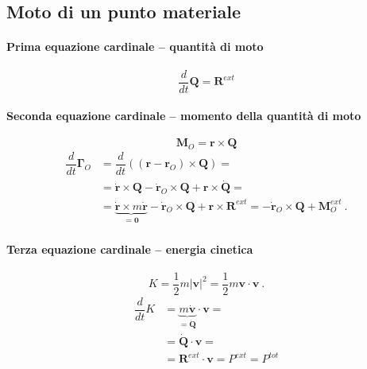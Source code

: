 \subsection{Moto di un punto materiale}
\paragraph{Prima equazione cardinale -- quantità di moto}
\begin{equation}
    \dfrac{d}{dt} \mathbf{Q} = \mathbf{R}^{ext}
\end{equation}

\paragraph{Seconda equazione cardinale -- momento della quantità di moto}
\begin{equation} \mathbf{M}_O = \mathbf{r} \times \mathbf{Q} \end{equation}
\begin{equation}
\begin{aligned}
    \dfrac{d}{dt} \mathbf{\Gamma}_O
    & = \dfrac{d}{dt} \left( (\mathbf{r} - \mathbf{r}_O ) \times \mathbf{Q} \right) = \\
    & = \dot{\mathbf{r}} \times \mathbf{Q} - \dot{\mathbf{r}}_O \times \mathbf{Q} + \mathbf{r} \times \dot{\mathbf{Q}} = \\
    & = \underbrace{\dot{\mathbf{r}} \times m \dot{\mathbf{r}}}_{=\mathbf{0}} - \dot{\mathbf{r}}_O \times \mathbf{Q} + \mathbf{r} \times \mathbf{R}^{ext} = - \dot{\mathbf{r}}_O \times \mathbf{Q} + \mathbf{M}_O^{ext} \ .
\end{aligned}
\end{equation}
\paragraph{Terza equazione cardinale -- energia cinetica}

\begin{equation} K = \dfrac{1}{2} m |\mathbf{v}|^2 = \dfrac{1}{2} m \mathbf{v} \cdot \mathbf{v} \ .
\end{equation}
\begin{equation}
\begin{aligned}
    \dfrac{d}{dt} K & = \underbrace{m \dot{\mathbf{v}}}_{=\dot{\mathbf{Q}}} \cdot \mathbf{v} = \\
    & = \dot{\mathbf{Q}} \cdot \mathbf{v} = \\
    & = \mathbf{R}^{ext} \cdot \mathbf{v} = P^{ext} = P^{tot}
\end{aligned}
\end{equation}

